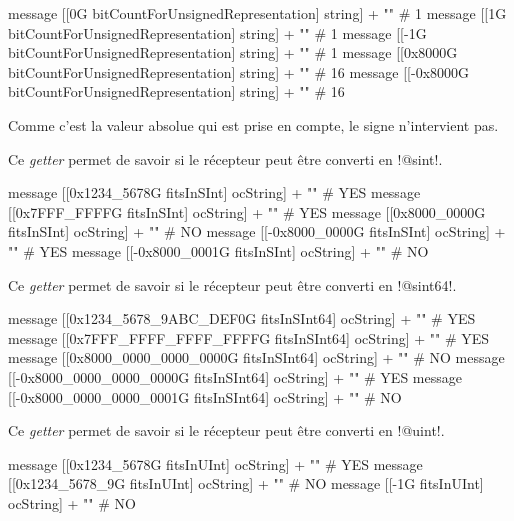 \begin{galgas}
message [[0G bitCountForUnsignedRepresentation] string] + "\n" # 1
message [[1G bitCountForUnsignedRepresentation] string] + "\n" # 1
message [[-1G bitCountForUnsignedRepresentation] string] + "\n" # 1
message [[0x8000G bitCountForUnsignedRepresentation] string] + "\n" # 16
message [[-0x8000G bitCountForUnsignedRepresentation] string] + "\n" # 16
\end{galgas}

Comme c'est la valeur absolue qui est prise en compte, le signe n'intervient pas.



Ce \emph{getter} permet de savoir si le récepteur peut être converti en \ggs!@sint!.

\begin{galgas}
message [[0x1234_5678G fitsInSInt] ocString] + "\n" # YES
message [[0x7FFF_FFFFG fitsInSInt] ocString] + "\n" # YES
message [[0x8000_0000G fitsInSInt] ocString] + "\n" # NO
message [[-0x8000_0000G fitsInSInt] ocString] + "\n" # YES
message [[-0x8000_0001G fitsInSInt] ocString] + "\n" # NO
\end{galgas}





Ce \emph{getter} permet de savoir si le récepteur peut être converti en \ggs!@sint64!.

\begin{galgas}
message [[0x1234_5678_9ABC_DEF0G fitsInSInt64] ocString] + "\n" # YES
message [[0x7FFF_FFFF_FFFF_FFFFG fitsInSInt64] ocString] + "\n" # YES
message [[0x8000_0000_0000_0000G fitsInSInt64] ocString] + "\n" # NO
message [[-0x8000_0000_0000_0000G fitsInSInt64] ocString] + "\n" # YES
message [[-0x8000_0000_0000_0001G fitsInSInt64] ocString] + "\n" # NO
\end{galgas}





Ce \emph{getter} permet de savoir si le récepteur peut être converti en \ggs!@uint!.

\begin{galgas}
message [[0x1234_5678G fitsInUInt] ocString] + "\n" # YES
message [[0x1234_5678_9G fitsInUInt] ocString] + "\n" # NO
message [[-1G fitsInUInt] ocString] + "\n" # NO
\end{galgas}






